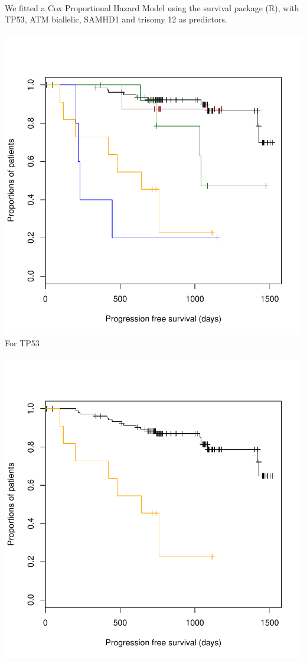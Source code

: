 \documentclass[a4paper,11pt]{article}
\begin{document}
\\We fitted a Cox Proportional Hazard Model using the survival package (R), with TP53, ATM biallelic, SAMHD1 and trisomy 12 as predictors.\\
\\
\includegraphics{HICF1_Finalreportv6-033}
\newpage
For TP53\\\
\\
\includegraphics{HICF1_Finalreportv6-035}
\end{document}
